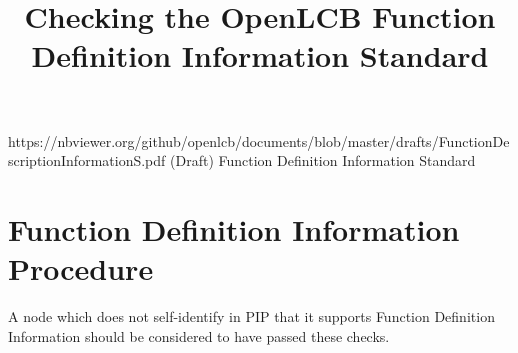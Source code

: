 

\title{Checking the OpenLCB Function Definition Information Standard}


\maketitle


\introductionCaveats
    {https://nbviewer.org/github/openlcb/documents/blob/master/drafts/FunctionDescriptionInformationS.pdf}
    {(Draft) Function Definition Information Standard}

\section{Function Definition Information Procedure}


A node which does not self-identify in PIP that it supports
Function Definition Information should be considered to have passed these checks.
\pipsetFootnote

\subsection{}


  
